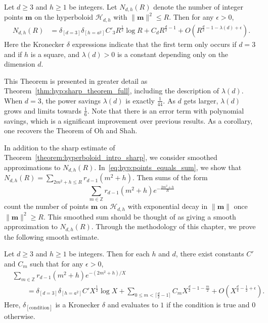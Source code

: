\begin{theorem}\label{theorem:hyperboloid_intro_sharp}
  Let $d \geq 3$ and $h \geq 1$ be integers.
  Let $N_{d,h}(R)$ denote the number of integer points $\bm{m}$ on the hyperboloid
  $\mathcal{H}_{d,h}$ with $\| \bm{m} \|^2 \leq R$.
  Then for any $\epsilon > 0$,
  \begin{align}
    N_{d,h}(R) &= \delta_{[d = 3]} \delta_{[h = a^2]} C'_3 R^{\frac{1}{2}} \log R + C_d
    R^{\frac{d}{2} - 1} + O(R^{\frac{d}{2} - 1 - \lambda(d) + \epsilon}).
  \end{align}
  Here the Kronecker $\delta$ expressions indicate that the first term only occurs if $d =
  3$ and if $h$ is a square, and $\lambda(d) > 0$ is a constant depending only on the
  dimension $d$.
\end{theorem}


This Theorem is presented in greater detail as Theorem~\ref{thm:hyp:sharp_theorem_full},
including the description of $\lambda(d)$.
When $d = 3$, the power savings $\lambda(d)$ is exactly $\frac{1}{44}$.
As $d$ gets larger, $\lambda(d)$ grows and limits towards $\frac{1}{6}$.
Note that there is an error term with polynomial savings, which is a significant
improvement over previous results.
As a corollary, one recovers the Theorem of Oh and Shah.

In addition to the sharp estimate of Theorem~\ref{theorem:hyperboloid_intro_sharp}, we
consider smoothed approximations to $N_{d,h}(R)$.
In~\eqref{eq:hyp:points_equals_sum}, we show that $N_{d,h}(R) = \sum_{2m^2+h \leq R}
r_{d-1}(m^2 + h)$.
Then sums of the form
\begin{equation}
  \sum_{m \in \mathbb{Z}} r_{d-1}(m^2 + h) e^{-\frac{2m^2 + h}{R}}
\end{equation}
count the number of points $\bm{m}$ on $\mathcal{H}_{d,h}$ with exponential decay in $\|
\bm{m} \|$ once $\| \bm{m} \|^2 \geq R$.
This smoothed sum should be thought of as giving a smooth approximation to $N_{d,h}(R)$.
Through the methodology of this chapter, we prove the following smooth estimate.


\begin{theorem}\label{theorem:hyperboloid_intro_smooth}
  Let $d \geq 3$ and $h \geq 1$ be integers.
  Then for each $h$ and $d$, there exist constants $C'$ and $C_m$ such that for any
  $\epsilon > 0$,
  \begin{align}
    &\sum_{m \in \mathbb{Z}} r_{d-1}(m^2 + h) e^{-(2m^2 + h)/X} \\
    &\qquad = \delta_{[d=3]} \delta_{[h = a^2]} C' X^{\frac{1}{2}} \log X + \sum_{0 \leq m
    < \lceil \frac{d}{2} - 1 \rceil} C_{m} X^{\frac{d}{2} - 1 -\frac{m}{2}}
    + O(X^{\frac{d}{4} - \frac{1}{2} + \epsilon}).
  \end{align}
  Here, $\delta_{[\text{condition}]}$ is a Kronecker $\delta$ and evaluates to $1$ if the
  condition is true and $0$ otherwise.
\end{theorem}



